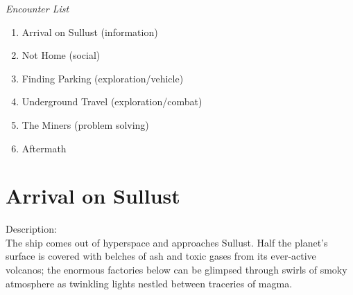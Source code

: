 \documentclass{book}
\begin{document}
\begin{multicols}{2}
\emph{Encounter List}
\begin{enumerate}
    \item Arrival on Sullust (information)
    \item Not Home (social)
    \item Finding Parking (exploration/vehicle)
    \item Underground Travel (exploration/combat)
    \item The Miners (problem solving)
    \item Aftermath
\end{enumerate}

\section{Arrival on Sullust}


Description:\\
The ship comes out of hyperspace and approaches Sullust. Half the planet’s surface is covered with belches of ash and toxic gases from its ever-active volcanos; the enormous factories below can be glimpsed through swirls of smoky atmosphere as twinkling lights nestled between traceries of magma.


\end{multicols}
\end{document}
